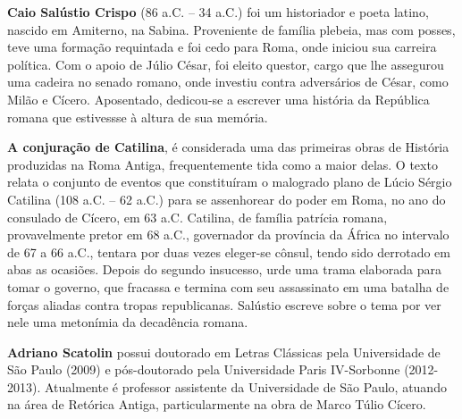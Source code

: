 \textbf{Caio Salústio Crispo} (86 a.C. -- 34 a.C.) foi um historiador e poeta latino, nascido em Amiterno, na Sabina. Proveniente de família plebeia, mas com posses, teve uma formação requintada e foi cedo para Roma, onde iniciou sua carreira política. Com o apoio de Júlio César, foi eleito questor, cargo que lhe assegurou uma cadeira no senado romano, onde investiu contra adversários de César, como Milão e Cícero. Aposentado, dedicou-se a escrever uma história da República romana que estivessse à altura de sua memória.


\textbf{A conjuração de Catilina}, é considerada uma das primeiras obras de História produzidas na Roma Antiga, frequentemente tida como a maior delas. O texto relata o conjunto de eventos que constituíram o malogrado plano de Lúcio Sérgio Catilina (108 a.C. -- 62 a.C.) para se assenhorear do poder em Roma, no ano do consulado de Cícero, em 63 a.C. Catilina, de família patrícia romana, provavelmente pretor em 68 a.C., governador da província da África no intervalo de 67 a 66 a.C., tentara por duas vezes eleger-se cônsul, tendo sido derrotado em abas as ocasiões. Depois do segundo insucesso, urde uma trama elaborada para tomar o governo, que fracassa e termina com seu assassinato em uma batalha de forças aliadas contra tropas republicanas. Salústio escreve sobre o tema por ver nele uma metonímia da decadência romana.


\textbf{Adriano Scatolin} possui doutorado em Letras Clássicas pela Universidade de São Paulo (2009) e pós-doutorado pela Universidade Paris IV-Sorbonne (2012-2013). Atualmente é professor assistente da Universidade de São Paulo, atuando na área de Retórica Antiga, particularmente na obra de Marco Túlio Cícero.\par
